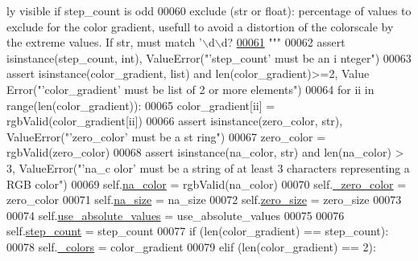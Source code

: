 \begin{DoxyCode}
{      ly visible if step\_count is odd}
00060 \textcolor{stringliteral}{            exclude (str or float): percentage of values to exclude for the color
       gradient, usefull to avoid a distortion of the colorscale by the extreme values.
       If str, must match '\(\backslash\)d\(\backslash\)d?%
\hypertarget{displayConfig_8py_source_l00061}{}\hyperlink{classnavicom_1_1displayConfig_1_1DisplayConfig_a26387ee9e6fe63612bc87a4d5d4a17f2}{00061} \textcolor{stringliteral}{        """}
00062         \textcolor{keyword}{assert} isinstance(step\_count, int), ValueError(\textcolor{stringliteral}{"'step\_count' must be an i
      nteger"})
00063         \textcolor{keyword}{assert} isinstance(color\_gradient, list) \textcolor{keywordflow}{and} len(color\_gradient)>=2, Value
      Error(\textcolor{stringliteral}{"'color\_gradient' must be list of 2 or more elements"})
00064         \textcolor{keywordflow}{for} ii \textcolor{keywordflow}{in} range(len(color\_gradient)):
00065             color\_gradient[ii] = rgbValid(color\_gradient[ii])
00066         \textcolor{keyword}{assert} isinstance(zero\_color, str), ValueError(\textcolor{stringliteral}{"'zero\_color' must be a st
      ring"})
00067         zero\_color = rgbValid(zero\_color)
00068         \textcolor{keyword}{assert} isinstance(na\_color, str) \textcolor{keywordflow}{and} len(na\_color) > 3, ValueError(\textcolor{stringliteral}{"'na\_c
      olor' must be a string of at least 3 characters representing a RGB color"})
00069         self.\hyperlink{classnavicom_1_1displayConfig_1_1DisplayConfig_ad8f95c1e3b29ac5622a18b7328b07f50}{na_color} = rgbValid(na\_color)
00070         self.\hyperlink{classnavicom_1_1displayConfig_1_1DisplayConfig_a65435f89606c60323d44bac7e1ee0340}{_zero_color} = zero\_color
00071         self.\hyperlink{classnavicom_1_1displayConfig_1_1DisplayConfig_aa157506adb33080de983987dd182fa29}{na_size} = na\_size
00072         self.\hyperlink{classnavicom_1_1displayConfig_1_1DisplayConfig_aab0e7c765bfc4071416c5e04fd7bbb2f}{zero_size} = zero\_size
00073 
00074         self.\hyperlink{classnavicom_1_1displayConfig_1_1DisplayConfig_a86870c1c1b5c920d4cc93554c7528d8a}{use_absolute_values} = use\_absolute\_values
00075 
00076         self.\hyperlink{classnavicom_1_1displayConfig_1_1DisplayConfig_a79144928881551fa1f1a18d062d761ea}{step_count} = step\_count
00077         \textcolor{keywordflow}{if} (len(color\_gradient) == step\_count):
00078             self.\hyperlink{classnavicom_1_1displayConfig_1_1DisplayConfig_aad7d4675303fbdf926ded6041ae876cf}{_colors} = color\_gradient
00079         \textcolor{keywordflow}{elif} (len(color\_gradient) == 2):
}
\end{DoxyCode}
